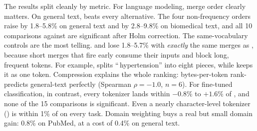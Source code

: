The results split cleanly by metric.
For language modeling, merge order clearly matters.
On general text, \freq beats every alternative.
The four non-frequency orders raise \bpb by 1.8--5.8\% on general text and by 2.8--9.8\% on biomedical text, and all 10 \bpb comparisons against \freq are significant after Holm correction.
The same-vocabulary controls are the most telling.
\randorder and \revorder lose 1.8--5.7\% \bpb with \emph{exactly} the same merges as \freq, because short merges that fire early consume their inputs and block long, frequent tokens.
For example, \revorder splits ``\,hypertension'' into eight pieces, while \freq keeps it as one token.
Compression explains the whole ranking: bytes-per-token rank-predicts general-text \bpb perfectly (Spearman $\rho=-1.0$, $n=6$).
For fine-tuned classification, in contrast, every tokenizer lands within $-0.8\%$ to $+1.6\%$ of \freq, and none of the 15 comparisons is significant.
Even a nearly character-level tokenizer (\revlearn) is within 1\% of \freq on every task.
Domain weighting buys a real but small domain gain: 0.8\% \bpb on PubMed, at a cost of 0.4\% on general text.

